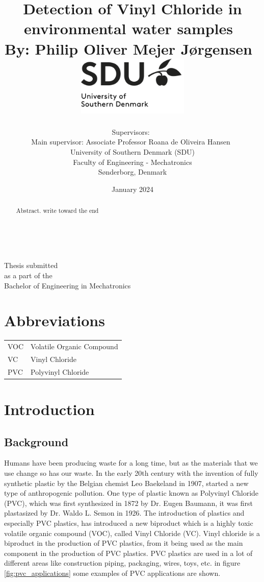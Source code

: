 \documentclass{article}
\title{\textbf{Detection of Vinyl Chloride in environmental water samples}~\\[5mm]
\large{By: Philip Oliver Mejer Jørgensen}~\\[5mm]
\includegraphics[width=0.4\textwidth]{sdulogo.png}}
\author{
Supervisors:~\\[3mm]
Main supervisor: Associate Professor Roana de Oliveira Hansen~\\[15mm]
University of Southern Denmark (SDU)\\
Faculty of Engineering - Mechatronics\\
Sønderborg, Denmark
}
\date{January 2024}
\begin{document}
\maketitle
~\\[2mm]
\begin{center}
\large{
Thesis submitted\\
as a part of the\\
Bachelor of Engineering in Mechatronics
}
\end{center}
\thispagestyle{empty}
\newpage

\begin{abstract}
Abstract. write toward the end
\end{abstract}

\listoffigures

\section*{Abbreviations}
\begin{tabular}{ll}
VOC     & Volatile Organic Compound \\
VC      & Vinyl Chloride \\
PVC     & Polyvinyl Chloride \\
\end{tabular}
\newpage

\tableofcontents

\newpage




\section{Introduction}
\subsection{Background}
Humans have been producing waste for a long time, but as the materials that we use change so has our waste.
In the early 20th century with the invention of fully synthetic plastic by the Belgian chemist Leo Baekeland in 1907\cite{plastic_history}, started a new type of anthropogenic pollution.
One type of plastic known as Polyvinyl Chloride (PVC), which was first synthesized in 1872 by Dr. Eugen Baumann\cite{pvc_origin}, it was first plastasized by Dr. Waldo L. Semon in 1926\cite{history_pvc}.
The introduction of plastics and especially PVC plastics, has introduced a new biproduct which is a highly toxic volatile organic compound (VOC), called Vinyl Chloride (VC).
Vinyl chloride is a biproduct in the production of PVC plastics, from it being used as the main component in the production of PVC plastics.
PVC plastics are used in a lot of different areas like construction piping, packaging, wires, toys, etc. in figure \ref{fig:pvc_applications} some examples of PVC applications are shown.
\end{document}

